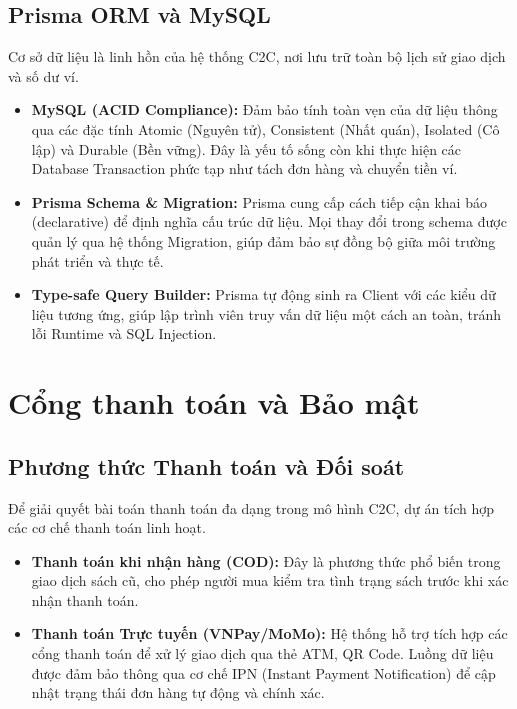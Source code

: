 \documentclass[../main.tex]{subfiles}
\begin{document}
\subsection{Prisma ORM và MySQL}
Cơ sở dữ liệu là linh hồn của hệ thống C2C, nơi lưu trữ toàn bộ lịch sử giao dịch và số dư ví.
\begin{itemize}
    \item \textbf{MySQL (ACID Compliance):} Đảm bảo tính toàn vẹn của dữ liệu thông qua các đặc tính Atomic (Nguyên tử), Consistent (Nhất quán), Isolated (Cô lập) và Durable (Bền vững). Đây là yếu tố sống còn khi thực hiện các Database Transaction phức tạp như tách đơn hàng và chuyển tiền ví.
    \item \textbf{Prisma Schema \& Migration:} Prisma cung cấp cách tiếp cận khai báo (declarative) để định nghĩa cấu trúc dữ liệu. Mọi thay đổi trong schema được quản lý qua hệ thống Migration, giúp đảm bảo sự đồng bộ giữa môi trường phát triển và thực tế.
    \item \textbf{Type-safe Query Builder:} Prisma tự động sinh ra Client với các kiểu dữ liệu tương ứng, giúp lập trình viên truy vấn dữ liệu một cách an toàn, tránh lỗi Runtime và SQL Injection.
\end{itemize}

\section{Cổng thanh toán và Bảo mật}
 
\subsection{Phương thức Thanh toán và Đối soát}
Để giải quyết bài toán thanh toán đa dạng trong mô hình C2C, dự án tích hợp các cơ chế thanh toán linh hoạt.
\begin{itemize}
    \item \textbf{Thanh toán khi nhận hàng (COD):} Đây là phương thức phổ biến trong giao dịch sách cũ, cho phép người mua kiểm tra tình trạng sách trước khi xác nhận thanh toán.
    \item \textbf{Thanh toán Trực tuyến (VNPay/MoMo):} Hệ thống hỗ trợ tích hợp các cổng thanh toán để xử lý giao dịch qua thẻ ATM, QR Code. Luồng dữ liệu được đảm bảo thông qua cơ chế IPN (Instant Payment Notification) để cập nhật trạng thái đơn hàng tự động và chính xác.
\end{itemize}
\end{document}
